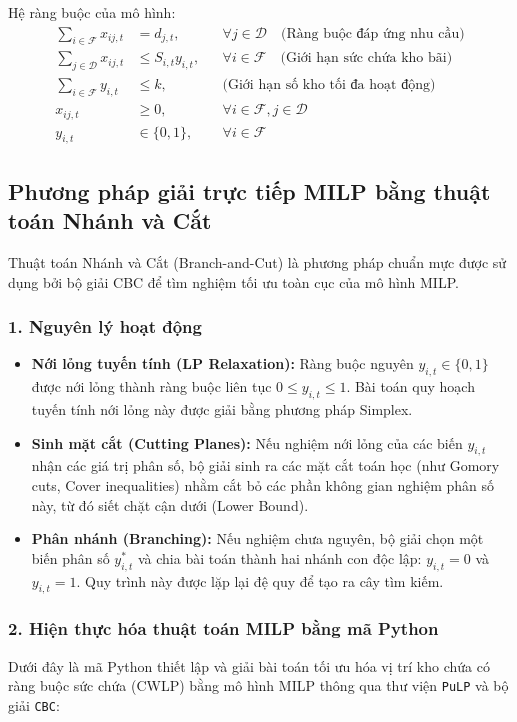 Hệ ràng buộc của mô hình:
\begin{align}
    \sum_{i \in \mathcal{F}} x_{ij,t} &= d_{j,t}, && \forall j \in \mathcal{D} \quad \text{(Ràng buộc đáp ứng nhu cầu)} \\
    \sum_{j \in \mathcal{D}} x_{ij,t} &\le S_{i,t} y_{i,t}, && \forall i \in \mathcal{F} \quad \text{(Giới hạn sức chứa kho bãi)} \\
    \sum_{i \in \mathcal{F}} y_{i,t} &\le k, && \text{(Giới hạn số kho tối đa hoạt động)} \\
    x_{ij,t} &\ge 0, && \forall i \in \mathcal{F}, j \in \mathcal{D} \\
    y_{i,t} &\in \{0, 1\}, && \forall i \in \mathcal{F}
\end{align}

\subsection{Phương pháp giải trực tiếp MILP bằng thuật toán Nhánh và Cắt}

Thuật toán Nhánh và Cắt (Branch-and-Cut) là phương pháp chuẩn mực được sử dụng bởi bộ giải CBC để tìm nghiệm tối ưu toàn cục của mô hình MILP.

\subsubsection{1. Nguyên lý hoạt động}
\begin{itemize}
    \item \textbf{Nới lỏng tuyến tính (LP Relaxation):} Ràng buộc nguyên $y_{i,t} \in \{0, 1\}$ được nới lỏng thành ràng buộc liên tục $0 \le y_{i,t} \le 1$. Bài toán quy hoạch tuyến tính nới lỏng này được giải bằng phương pháp Simplex.
    \item \textbf{Sinh mặt cắt (Cutting Planes):} Nếu nghiệm nới lỏng của các biến $y_{i,t}$ nhận các giá trị phân số, bộ giải sinh ra các mặt cắt toán học (như Gomory cuts, Cover inequalities) nhằm cắt bỏ các phần không gian nghiệm phân số này, từ đó siết chặt cận dưới (Lower Bound).
    \item \textbf{Phân nhánh (Branching):} Nếu nghiệm chưa nguyên, bộ giải chọn một biến phân số $y_{i,t}^*$ và chia bài toán thành hai nhánh con độc lập: $y_{i,t} = 0$ và $y_{i,t} = 1$. Quy trình này được lặp lại đệ quy để tạo ra cây tìm kiếm.
\end{itemize}

\subsubsection{2. Hiện thực hóa thuật toán MILP bằng mã Python}
Dưới đây là mã Python thiết lập và giải bài toán tối ưu hóa vị trí kho chứa có ràng buộc sức chứa (CWLP) bằng mô hình MILP thông qua thư viện \texttt{PuLP} và bộ giải \texttt{CBC}:

